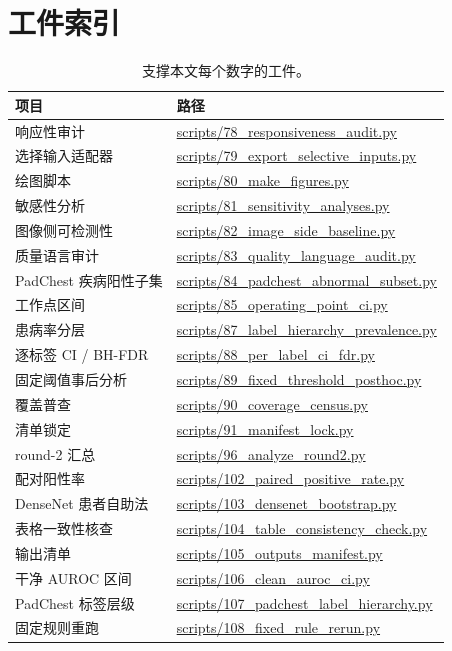 \section{工件索引}
\label{app:artifacts}

\begin{table}[H]
\centering
\footnotesize
\setlength{\tabcolsep}{4pt}
\renewcommand{\arraystretch}{0.92}
\caption{支撑本文每个数字的工件。}
\label{tab:artifacts}
\begin{tabular}{ll}
\toprule
项目 & 路径 \\
\midrule
响应性审计 & \url{scripts/78_responsiveness_audit.py} \\
选择输入适配器 & \url{scripts/79_export_selective_inputs.py} \\
绘图脚本 & \url{scripts/80_make_figures.py} \\
敏感性分析 & \url{scripts/81_sensitivity_analyses.py} \\
图像侧可检测性 & \url{scripts/82_image_side_baseline.py} \\
质量语言审计 & \url{scripts/83_quality_language_audit.py} \\
PadChest 疾病阳性子集 & \url{scripts/84_padchest_abnormal_subset.py} \\
工作点区间 & \url{scripts/85_operating_point_ci.py} \\
患病率分层 & \url{scripts/87_label_hierarchy_prevalence.py} \\
逐标签 CI / BH-FDR & \url{scripts/88_per_label_ci_fdr.py} \\
固定阈值事后分析 & \url{scripts/89_fixed_threshold_posthoc.py} \\
覆盖普查 & \url{scripts/90_coverage_census.py} \\
清单锁定 & \url{scripts/91_manifest_lock.py} \\
round-2 汇总 & \url{scripts/96_analyze_round2.py} \\
配对阳性率 & \url{scripts/102_paired_positive_rate.py} \\
DenseNet 患者自助法 & \url{scripts/103_densenet_bootstrap.py} \\
表格一致性核查 & \url{scripts/104_table_consistency_check.py} \\
输出清单 & \url{scripts/105_outputs_manifest.py} \\
干净 AUROC 区间 & \url{scripts/106_clean_auroc_ci.py} \\
PadChest 标签层级 & \url{scripts/107_padchest_label_hierarchy.py} \\
固定规则重跑 & \url{scripts/108_fixed_rule_rerun.py} \\

\end{tabular}
\end{table}
